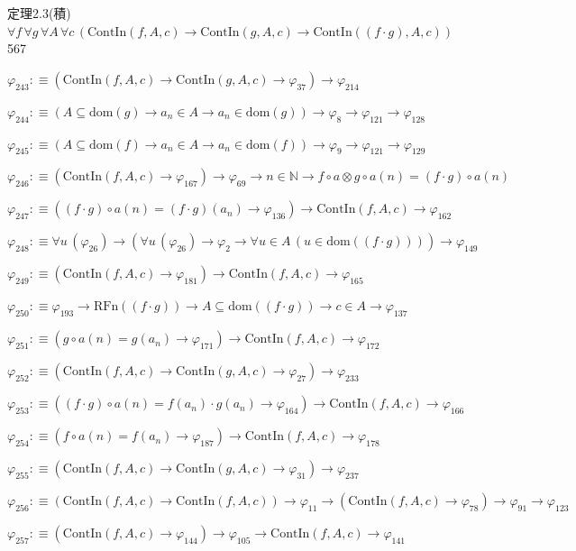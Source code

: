 \begin{fullproof}{定理2.3(積)}{$\forall f\,\forall g\,\forall A\,\forall c\,(\mathrm{ContIn}(f,A,c) \to \mathrm{ContIn}(g,A,c) \to \mathrm{ContIn}((f \cdot g),A,c))$}{567}
\begin{abbrevlist}
\item $\varphi_{243} :\equiv (\mathrm{ContIn}(f,A,c) \to \mathrm{ContIn}(g,A,c) \to \varphi_{37}) \to \varphi_{214}$
\item $\varphi_{244} :\equiv (A \subseteq \mathrm{dom}(g) \to a_{n} \in A \to a_{n} \in \mathrm{dom}(g)) \to \varphi_{8} \to \varphi_{121} \to \varphi_{128}$
\item $\varphi_{245} :\equiv (A \subseteq \mathrm{dom}(f) \to a_{n} \in A \to a_{n} \in \mathrm{dom}(f)) \to \varphi_{9} \to \varphi_{121} \to \varphi_{129}$
\item $\varphi_{246} :\equiv (\mathrm{ContIn}(f,A,c) \to \varphi_{167}) \to \varphi_{69} \to n \in \mathbb{N} \to f \circ a \otimes g \circ a(n) = (f \cdot g) \circ a(n)$
\item $\varphi_{247} :\equiv ((f \cdot g) \circ a(n) = (f \cdot g)(a_{n}) \to \varphi_{136}) \to \mathrm{ContIn}(f,A,c) \to \varphi_{162}$
\item $\varphi_{248} :\equiv \forall u\,(\varphi_{26}) \to (\forall u\,(\varphi_{26}) \to \varphi_{2} \to \forall u \in A\,(u \in \mathrm{dom}((f \cdot g)))) \to \varphi_{149}$
\item $\varphi_{249} :\equiv (\mathrm{ContIn}(f,A,c) \to \varphi_{181}) \to \mathrm{ContIn}(f,A,c) \to \varphi_{165}$
\item $\varphi_{250} :\equiv \varphi_{193} \to \mathrm{RFn}((f \cdot g)) \to A \subseteq \mathrm{dom}((f \cdot g)) \to c \in A \to \varphi_{137}$
\item $\varphi_{251} :\equiv (g \circ a(n) = g(a_{n}) \to \varphi_{171}) \to \mathrm{ContIn}(f,A,c) \to \varphi_{172}$
\item $\varphi_{252} :\equiv (\mathrm{ContIn}(f,A,c) \to \mathrm{ContIn}(g,A,c) \to \varphi_{27}) \to \varphi_{233}$
\item $\varphi_{253} :\equiv ((f \cdot g) \circ a(n) = f(a_{n}) \cdot g(a_{n}) \to \varphi_{164}) \to \mathrm{ContIn}(f,A,c) \to \varphi_{166}$
\item $\varphi_{254} :\equiv (f \circ a(n) = f(a_{n}) \to \varphi_{187}) \to \mathrm{ContIn}(f,A,c) \to \varphi_{178}$
\item $\varphi_{255} :\equiv (\mathrm{ContIn}(f,A,c) \to \mathrm{ContIn}(g,A,c) \to \varphi_{31}) \to \varphi_{237}$
\item $\varphi_{256} :\equiv (\mathrm{ContIn}(f,A,c) \to \mathrm{ContIn}(f,A,c)) \to \varphi_{11} \to (\mathrm{ContIn}(f,A,c) \to \varphi_{78}) \to \varphi_{91} \to \varphi_{123}$
\item $\varphi_{257} :\equiv (\mathrm{ContIn}(f,A,c) \to \varphi_{144}) \to \varphi_{105} \to \mathrm{ContIn}(f,A,c) \to \varphi_{141}$

\end{abbrevlist}
\end{fullproof}
